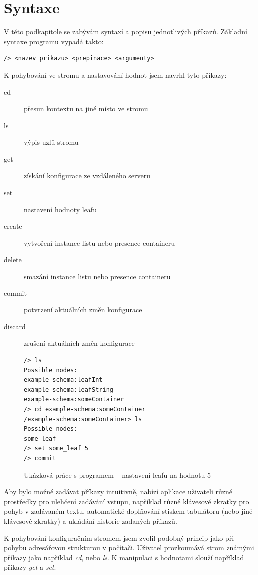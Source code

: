 \documentclass[thesis=B,czech,hidelinks]{FITthesis}[2019/03/06]
\begin{document}
\section{Syntaxe}
V této podkapitole se zabývám syntaxí a popisu jednotlivých příkazů. Základní syntaxe programu vypadá takto:
\begin{verbatim}
/> <nazev prikazu> <prepinace> <argumenty>
\end{verbatim}
K pohybování ve stromu a nastavování hodnot jsem navrhl tyto příkazy:

\begin{description}
\item[cd]{přesun kontextu na jiné místo ve stromu}
\item[ls]{výpis uzlů stromu}
\item[get]{získání konfigurace ze vzdáleného serveru}
\item[set]{nastavení hodnoty leafu}
\item[create]{vytvoření instance listu nebo presence containeru}
\item[delete]{smazání instance listu nebo presence containeru}
\item[commit]{potvrzení aktuálních změn konfigurace}
\item[discard]{zrušení aktuálních změn konfigurace}
\end{description}

\begin{figure}
\begin{verbatim}
/> ls
Possible nodes:
example-schema:leafInt
example-schema:leafString
example-schema:someContainer
/> cd example-schema:someContainer
/example-schema:someContainer> ls
Possible nodes:
some_leaf
/> set some_leaf 5
/> commit
\end{verbatim}
\caption{Ukázková práce s programem -- nastavení leafu na hodnotu 5}\label{ukazka}
\end{figure}

Aby bylo možné zadávat příkazy intuitivně, nabízí aplikace uživateli různé prostředky pro ulehčení zadávání vstupu, například různé klávesové zkratky pro pohyb v zadávaném textu, automatické doplňování stiskem tabulátoru (nebo jiné klávesové zkratky) a ukládání historie zadaných příkazů.


K pohybování konfiguračním stromem jsem zvolil podobný princip jako při pohybu adresářovou strukturou v počítači. Uživatel prozkoumává strom známými příkazy jako například \textit{cd}, nebo \textit{ls}. K manipulaci s hodnotami slouží například příkazy \textit{get} a \textit{set}.
\end{document}
